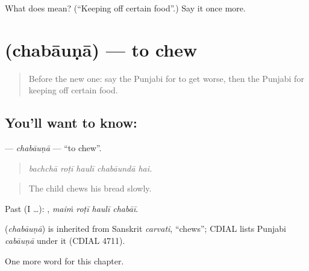 \begin{tcolorbox}[breakable,colback=teal!4,colframe=teal!35!black,title={Before you move on}]
What does  mean? (\textquotedblleft{}Keeping off certain food\textquotedblright{}.) Say it once more.
\end{tcolorbox}
\section[\texorpdfstring{\pa{ਚਬਾਉਣਾ} (chabāuṇā)}{ਚਬਾਉਣਾ (chabāuṇā)}]{ (chabāuṇā) — to chew}

\label{lesson:PA-C325-chabauna}



\begin{quote}
Before the new one: say the Punjabi for to get worse, then the Punjabi for keeping off certain food.
\end{quote}

\subsection*{You'll want to know: }
\textbf{} — \emph{chabāuṇā} — \textquotedblleft{}to chew\textquotedblright{}.

\begin{quote}
    
\end{quote}

\begin{quote}
\emph{bachchā roṭī haulī chabāundā hai.}
\end{quote}

\begin{quote}
The child chews his bread slowly.
\end{quote}

Past (I …):    , \emph{maiṁ roṭī haulī chabāī}.

\begin{cousinweb}
\textbf{} (\emph{chabāuṇā}) is inherited from Sanskrit \emph{carvati}, \textquotedblleft{}chews\textquotedblright{}; CDIAL lists Punjabi \emph{cabāuṇā} under it (CDIAL 4711).
\end{cousinweb}

\begin{grammarlens}[title={What you've built}]
One more word for this chapter.
\end{grammarlens}

